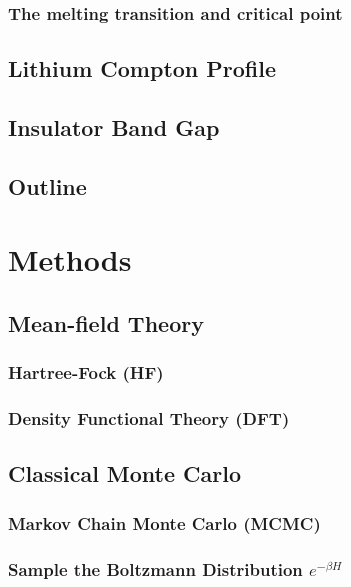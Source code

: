 \documentclass[draftthesis,fullpage]{uiucthesis}
\begin{document}
\subsection{The melting transition and critical point}
\section{Lithium Compton Profile}
\section{Insulator Band Gap}
\section{Outline}

\chapter{Methods}
\section{Mean-field Theory}
\subsection{Hartree-Fock (HF)}
\subsection{Density Functional Theory (DFT)}
\section{Classical Monte Carlo}
\subsection{Markov Chain Monte Carlo (MCMC)}
\subsection{Sample the Boltzmann Distribution $e^{-\beta H}$}
\end{document}
